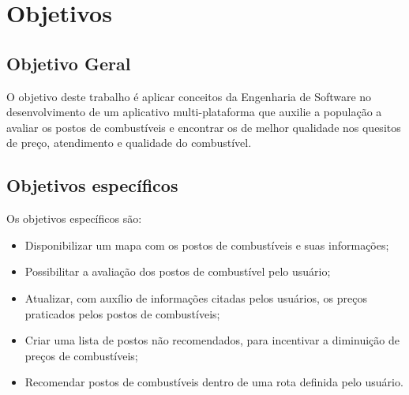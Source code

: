 \section{Objetivos}

\subsection{Objetivo Geral}

O objetivo deste trabalho é aplicar conceitos da Engenharia de Software no desenvolvimento de um aplicativo multi-plataforma que auxilie a população a avaliar os postos de combustíveis e encontrar os de melhor qualidade nos quesitos de preço, atendimento e qualidade do combustível.

\subsection{Objetivos específicos}

Os objetivos específicos são:
\begin{itemize}
    \item Disponibilizar um mapa com os postos de combustíveis e suas informações;
    \item Possibilitar a avaliação dos postos de combustível pelo usuário;
    \item Atualizar, com auxílio de informações citadas pelos usuários, os preços praticados pelos postos de combustíveis;
    \item Criar uma lista de postos não recomendados, para incentivar a diminuição de preços de combustíveis;
    \item Recomendar postos de combustíveis dentro de uma rota definida pelo usuário.
\end{itemize}
